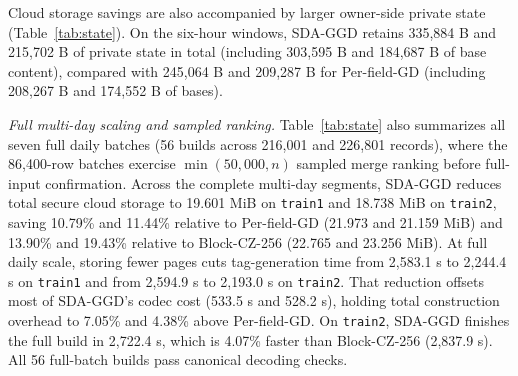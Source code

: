\documentclass[10pt,journal]{IEEEtran}
\begin{document}
Cloud storage savings are also accompanied by larger owner-side private state (Table~\ref{tab:state}). On the six-hour windows, SDA-GGD retains 335,884 B and 215,702 B of private state in total (including 303,595 B and 184,687 B of base content), compared with 245,064 B and 209,287 B for Per-field-GD (including 208,267 B and 174,552 B of bases).

\emph{Full multi-day scaling and sampled ranking.}
Table~\ref{tab:state} also summarizes all seven full daily batches (56 builds across 216,001 and 226,801 records), where the 86,400-row batches exercise $\min(50{,}000,n)$ sampled merge ranking before full-input confirmation. Across the complete multi-day segments, SDA-GGD reduces total secure cloud storage to 19.601 MiB on \texttt{train1} and 18.738 MiB on \texttt{train2}, saving 10.79\% and 11.44\% relative to Per-field-GD (21.973 and 21.159 MiB) and 13.90\% and 19.43\% relative to Block-CZ-256 (22.765 and 23.256 MiB). At full daily scale, storing fewer pages cuts tag-generation time from 2,583.1 s to 2,244.4 s on \texttt{train1} and from 2,594.9 s to 2,193.0 s on \texttt{train2}. That reduction offsets most of SDA-GGD's codec cost (533.5 s and 528.2 s), holding total construction overhead to 7.05\% and 4.38\% above Per-field-GD. On \texttt{train2}, SDA-GGD finishes the full build in 2,722.4 s, which is 4.07\% faster than Block-CZ-256 (2,837.9 s). All 56 full-batch builds pass canonical decoding checks.
\end{document}
